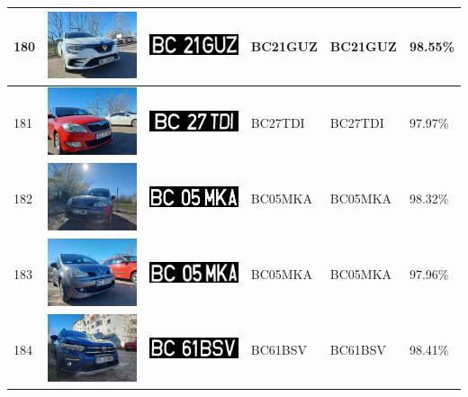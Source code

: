 \documentclass[a4paper,12pt]{report}
\begin{document}
\begin{longtable}{| m{0.6cm} | m{3cm} | m{3cm} | m{1.8cm} | m{1.8cm} | m{1.8cm} |}
        180 & \includegraphics[width=3cm,keepaspectratio]{dataset/111_s1.jpg} & \includegraphics[width=3cm,keepaspectratio]{segmentari/180.jpg} & BC21GUZ & BC21GUZ & 98.55\% \\ \hline
        181 & \includegraphics[width=3cm,keepaspectratio]{dataset/112_s1.jpg} & \includegraphics[width=3cm,keepaspectratio]{segmentari/181.jpg} & BC27TDI & BC27TDI & 97.97\% \\ \hline
        182 & \includegraphics[width=3cm,keepaspectratio]{dataset/113_d1.jpg} & \includegraphics[width=3cm,keepaspectratio]{segmentari/182.jpg} & BC05MKA & BC05MKA & 98.32\% \\ \hline
        183 & \includegraphics[width=3cm,keepaspectratio]{dataset/113_s1.jpg} & \includegraphics[width=3cm,keepaspectratio]{segmentari/183.jpg} & BC05MKA & BC05MKA & 97.96\% \\ \hline
        184 & \includegraphics[width=3cm,keepaspectratio]{dataset/114_d1.jpg} & \includegraphics[width=3cm,keepaspectratio]{segmentari/184.jpg} & BC61BSV & BC61BSV & 98.41\% \\ \hline

\end{longtable}
\end{document}
